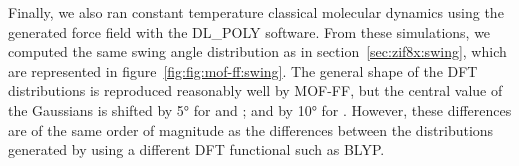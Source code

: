 \documentclass[thesis]{subfiles}
\begin{document}
Finally, we also ran constant temperature classical molecular dynamics using the
generated force field with the DL\_POLY software. From these simulations, we
computed the same swing angle distribution as in section~\ref{sec:zif8x:swing},
which are represented in figure~\ref{fig:fig:mof-ff:swing}. The general shape of
the DFT distributions is reproduced reasonably well by MOF-FF, but the central
value of the Gaussians is shifted by 5° for \ZIFCl and \ZIFBr; and by 10° for
. However, these differences are of the same order of magnitude as the
differences between the distributions generated by using a different DFT
functional such as BLYP\cite{Coudert2017}.

\OnlyInSubfile{\printbibliography}
\end{document}
